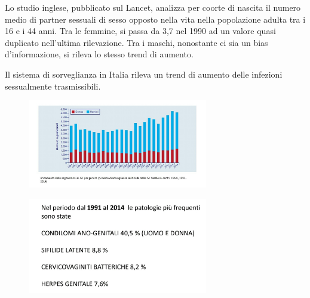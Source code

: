 Lo studio inglese, pubblicato sul
Lancet, analizza per coorte di nascita il numero medio di partner
sessuali di sesso opposto nella vita nella popolazione adulta tra i 16 e
i 44 anni. Tra le femmine, si passa da 3,7 nel 1990 ad un valore quasi
duplicato nell'ultima rilevazione. Tra i maschi, nonostante ci sia un
bias d'informazione, si rileva lo stesso trend di aumento.

Il sistema di sorveglianza in Italia rileva un trend di aumento delle
infezioni sessualmente trasmissibili.

\begin{figure}[!ht]
\centering
	\includegraphics[width=0.7\textwidth]{18/image12.jpeg}
\end{figure}

\begin{figure}[!ht]
\centering
	\includegraphics[width=0.7\textwidth]{18/image13.jpeg}
\end{figure}

